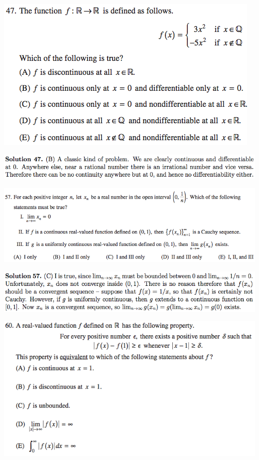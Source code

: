 \documentclass{article}
\begin{document}
\includegraphics[scale=0.65]{1268_47}

\includegraphics[scale=0.65]{1268_47s}

\includegraphics[scale=0.65]{1268_57}

\includegraphics[scale=0.65]{1268_57s}

\includegraphics[scale=0.65]{1268_60}
\end{document}
